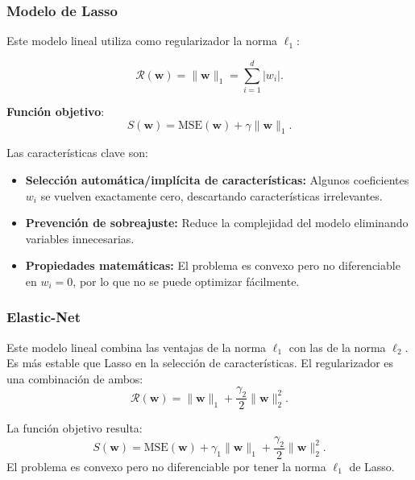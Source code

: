 \subsubsection{Modelo de Lasso}
Este modelo lineal utiliza como regularizador la norma $\ell_1$:

$$\mathcal{R}(\mathbf{w}) = \|\mathbf{w}\|_1 = \sum_{i=1}^d |w_i|.$$

\textbf{Función objetivo}:
$$S(\mathbf{w}) = \text{MSE}(\mathbf{w}) + \gamma \|\mathbf{w}\|_1.$$

Las características clave son:
\begin{itemize}
    \item \textbf{Selección automática/implícita de características:}  
          Algunos coeficientes $w_i$ se vuelven exactamente cero, descartando características irrelevantes.
    \item \textbf{Prevención de sobreajuste:}  
          Reduce la complejidad del modelo eliminando variables innecesarias.
    \item \textbf{Propiedades matemáticas:}  
          El problema es convexo pero no diferenciable en $w_i = 0$, por lo que no se puede optimizar fácilmente.
\end{itemize}

\subsubsection{Elastic-Net}
Este modelo lineal combina las ventajas de la norma $\ell_1$ con las de la norma $\ell_2$. Es más estable que Lasso en la selección de características.
El regularizador es una combinación de ambos:
$$
\mathcal{R}(\mathbf{w}) = \|\mathbf{w}\|_1 + \frac{\gamma_2}{2} \|\mathbf{w}\|_2^2.
$$

La función objetivo resulta:
$$
S(\mathbf{w}) = \text{MSE}(\mathbf{w}) + \gamma_1 \|\mathbf{w}\|_1 + \frac{\gamma_2}{2} \|\mathbf{w}\|_2^2.
$$
El problema es convexo pero no diferenciable por tener la norma $\ell_1$ de Lasso.

